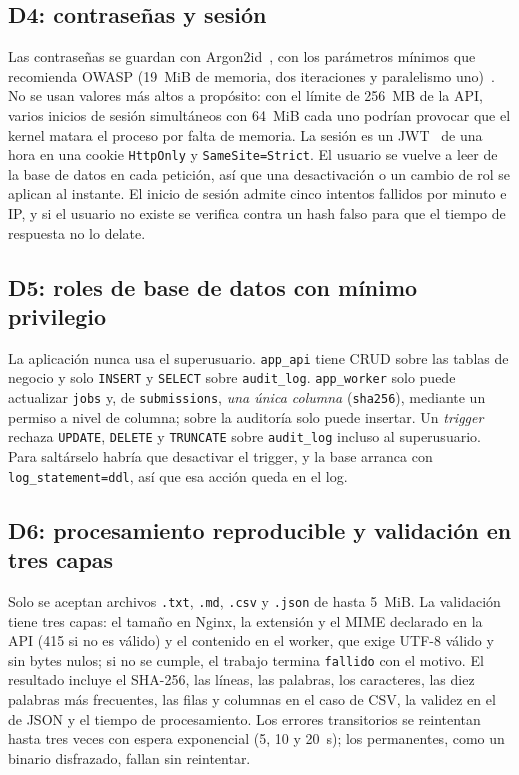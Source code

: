 \documentclass[conference,a4paper]{IEEEtran}
\newcommand{\cod}[1]{\texttt{#1}}
\begin{document}
\subsection{D4: contraseñas y sesión}
Las contraseñas se guardan con Argon2id~\cite{rfc9106}, con los parámetros mínimos que recomienda OWASP (19~MiB de memoria, dos iteraciones y paralelismo uno)~\cite{owasp-pw}. No se usan valores más altos a propósito: con el límite de 256~MB de la API, varios inicios de sesión simultáneos con 64~MiB cada uno podrían provocar que el kernel matara el proceso por falta de memoria. La sesión es un JWT~\cite{rfc7519} de una hora en una cookie \cod{HttpOnly} y \cod{SameSite=Strict}. El usuario se vuelve a leer de la base de datos en cada petición, así que una desactivación o un cambio de rol se aplican al instante. El inicio de sesión admite cinco intentos fallidos por minuto e IP, y si el usuario no existe se verifica contra un hash falso para que el tiempo de respuesta no lo delate.

\subsection{D5: roles de base de datos con mínimo privilegio}
La aplicación nunca usa el superusuario. \cod{app\_api} tiene CRUD sobre las tablas de negocio y solo \cod{INSERT} y \cod{SELECT} sobre \cod{audit\_log}. \cod{app\_worker} solo puede actualizar \cod{jobs} y, de \cod{submissions}, \emph{una única columna} (\cod{sha256}), mediante un permiso a nivel de columna; sobre la auditoría solo puede insertar. Un \textit{trigger} rechaza \cod{UPDATE}, \cod{DELETE} y \cod{TRUNCATE} sobre \cod{audit\_log} incluso al superusuario. Para saltárselo habría que desactivar el trigger, y la base arranca con \cod{log\_statement=ddl}, así que esa acción queda en el log.

\subsection{D6: procesamiento reproducible y validación en tres capas}
Solo se aceptan archivos \cod{.txt}, \cod{.md}, \cod{.csv} y \cod{.json} de hasta 5~MiB. La validación tiene tres capas: el tamaño en Nginx, la extensión y el MIME declarado en la API (415 si no es válido) y el contenido en el worker, que exige UTF-8 válido y sin bytes nulos; si no se cumple, el trabajo termina \cod{fallido} con el motivo. El resultado incluye el SHA-256, las líneas, las palabras, los caracteres, las diez palabras más frecuentes, las filas y columnas en el caso de CSV, la validez en el de JSON y el tiempo de procesamiento. Los errores transitorios se reintentan hasta tres veces con espera exponencial (5, 10 y 20~s); los permanentes, como un binario disfrazado, fallan sin reintentar.
\end{document}
